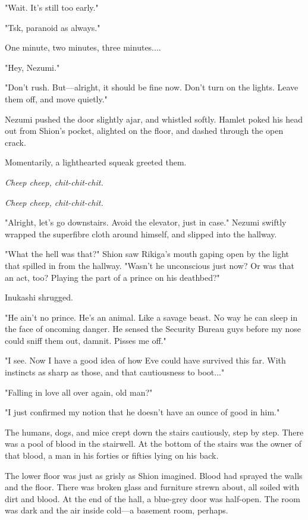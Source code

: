 "Wait. It's still too early."

"Tsk, paranoid as always."

One minute, two minutes, three minutes....

"Hey, Nezumi."

"Don't rush. But---alright, it should be fine now. Don't turn on the
lights. Leave them off, and move quietly."

Nezumi pushed the door slightly ajar, and whistled softly. Hamlet poked
his head out from Shion's pocket, alighted on the floor, and dashed
through the open crack.

Momentarily, a lighthearted squeak greeted them.

\emph{Cheep cheep, chit-chit-chit.}

\emph{Cheep cheep, chit-chit-chit.}

"Alright, let's go downstairs. Avoid the elevator, just in case." Nezumi
swiftly wrapped the superfibre cloth around himself, and slipped into
the hallway.

"What the hell was that?" Shion saw Rikiga's mouth gaping open by the
light that spilled in from the hallway. "Wasn't he unconscious just now?
Or was that an act, too? Playing the part of a prince on his deathbed?"

Inukashi shrugged.

"He ain't no prince. He's an animal. Like a savage beast. No way he can
sleep in the face of oncoming danger. He sensed the Security Bureau guys
before my nose could sniff them out, damnit. Pisses me off."

"I see. Now I have a good idea of how Eve could have survived this far.
With instincts as sharp as those, and that cautiousness to boot..."

"Falling in love all over again, old man?"

"I just confirmed my notion that he doesn't have an ounce of good in
him."

The humans, dogs, and mice crept down the stairs cautiously, step by
step. There was a pool of blood in the stairwell. At the bottom of the
stairs was the owner of that blood, a man in his forties or fifties
lying on his back.

The lower floor was just as grisly as Shion imagined. Blood had sprayed
the walls and the floor. There was broken glass and furniture strewn
about, all soiled with dirt and blood. At the end of the hall, a
blue-grey door was half-open. The room was dark and the air inside
cold---a basement room, perhaps.


